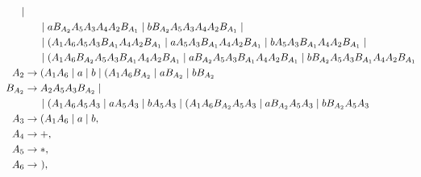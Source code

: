 \documentclass[12pt]{article}
\begin{document}
\begin{ejercicio}[2.5 puntos]
\begin{description}
\begin{align*}
                \mid \\ & \hspace{0.5cm} \mid  a B_{A_2}A_5A_3A_4 A_2 B_{A_1} \mid b B_{A_2}A_5A_3A_4 A_2 B_{A_1}
                \mid \\ & \hspace{0.5cm} \mid (A_1 A_6 A_5 A_3 B_{A_1}A_4 A_2 B_{A_1} \mid aA_5 A_3 B_{A_1}A_4 A_2 B_{A_1} \mid bA_5 A_3 B_{A_1}A_4 A_2 B_{A_1}
                \mid \\ & \hspace{0.5cm}  \mid (A_1 A_6 B_{A_2}A_5 A_3 B_{A_1}A_4 A_2 B_{A_1} \mid  a B_{A_2}A_5 A_3 B_{A_1}A_4 A_2 B_{A_1} \mid b B_{A_2}A_5 A_3 B_{A_1}A_4 A_2 B_{A_1} \\
            \hspace{-2.5cm}A_2 &\to (A_1 A_6 \mid a \mid b \mid (A_1 A_6 B_{A_2} \mid  a B_{A_2} \mid  b B_{A_2} \\
            \hspace{-2.5cm}B_{A_2} & \to A_2 A_5 A_3 B_{A_2}
                \mid \\ & \hspace{0.5cm}  \mid (A_1 A_6A_5 A_3 \mid aA_5 A_3 \mid b A_5 A_3\mid (A_1 A_6 B_{A_2}A_5 A_3 \mid  a B_{A_2}A_5 A_3 \mid  b B_{A_2}A_5 A_3 \\
            \hspace{-2.5cm}A_3 &\to (A_1 A_6 \mid a \mid b,\\
            \hspace{-2.5cm}A_4 &\to +,\\
            \hspace{-2.5cm}A_5 &\to *,\\
            \hspace{-2.5cm}A_6 &\to~),
        \end{align*}


\end{description}
\end{ejercicio}
\end{document}
